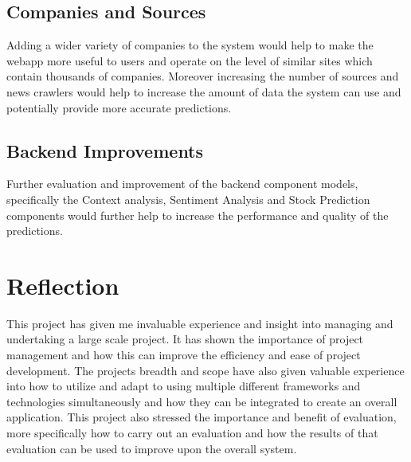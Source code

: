         \subsection{Companies and Sources}
        Adding a wider variety of companies to the system would help to make the webapp more useful to users and operate on the level of similar sites which contain thousands of companies. Moreover increasing the number of sources and news crawlers would help to increase the amount of data the system can use and potentially provide more accurate predictions.
        
        \subsection{Backend Improvements}
        Further evaluation and improvement of the backend component models, specifically the Context analysis, Sentiment Analysis and Stock Prediction components would further help to increase the performance and quality of the predictions.
        
        
    \section{Reflection}
    This project has given me invaluable experience and insight into managing and undertaking a large scale project. It has shown the importance of project management and how this can improve the efficiency and ease of project development. The projects breadth and scope have also given valuable experience into how to utilize and adapt to using multiple different frameworks and technologies simultaneously and how they can be integrated to create an overall application. This project also stressed the importance and benefit of evaluation, more specifically how to carry out an evaluation and how the results of that evaluation can be used to improve upon the overall system.
    
 